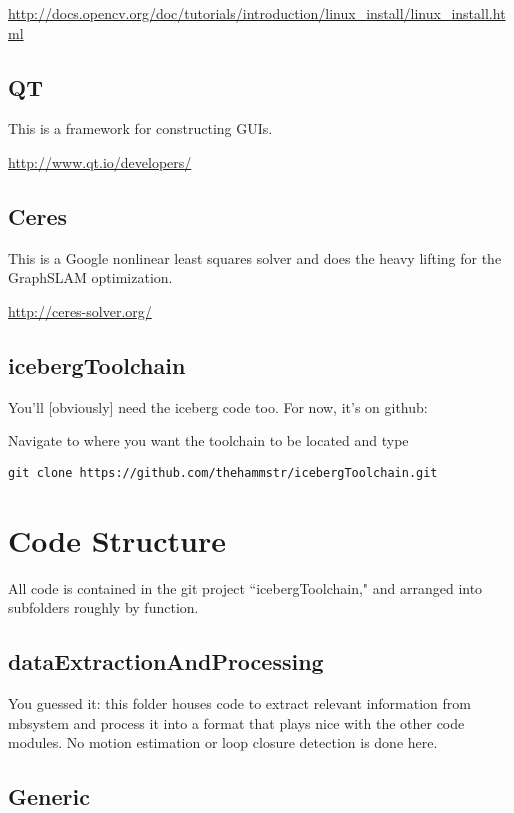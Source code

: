 \documentclass[12pt]{amsart}
\begin{document}
\url{http://docs.opencv.org/doc/tutorials/introduction/linux_install/linux_install.html}


\subsection*{QT}

This is a framework for constructing GUIs. 

\url{http://www.qt.io/developers/}

\subsection*{Ceres}

This is a Google nonlinear least squares solver and does the heavy lifting for the GraphSLAM optimization.

\url{http://ceres-solver.org/}

\subsection{icebergToolchain}

You'll [obviously] need the iceberg code too. For now, it's on github:

Navigate to where you want the toolchain to be located and type

\begin{lstlisting}
git clone https://github.com/thehammstr/icebergToolchain.git
\end{lstlisting}

\section{Code Structure}

All code is contained in the git project ``icebergToolchain," and arranged into subfolders roughly by function.

\subsection{dataExtractionAndProcessing}

You guessed it: this folder houses code to extract relevant information from mbsystem and process it into a format that plays nice with the other code modules. No motion estimation or loop closure detection is done here.

\subsection{Generic}
\end{document}
